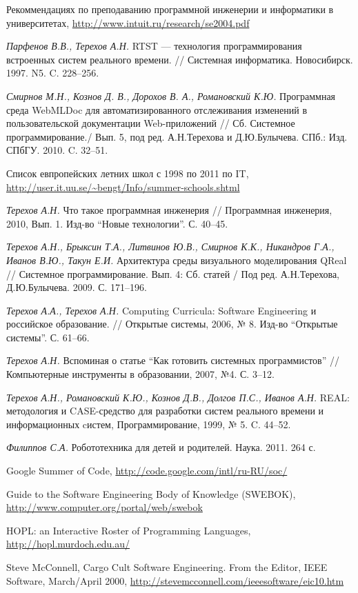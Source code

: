 \documentclass[a4paper]{article}
\begin{document}
\begin{thebibliography}{9001}
   Рекоммендациях по преподаванию программной инженерии и информатики в университетах, \url{http://www.intuit.ru/research/se2004.pdf}  

   \emph{Парфенов В.В., Терехов А.Н.} RTST --- технология программирования встроенных систем реального времени. // Системная информатика. Новосибирск. 1997. N5. C. 228--256.
  
  \emph{Смирнов М.Н., Кознов Д. В., Дорохов В. А., Романовский К.Ю.} Программная среда WebMLDoc для автоматизированного отслеживания изменений в пользовательской документации Web-приложений // Сб. Системное программирование./ Вып. 5, под ред. А.Н.Терехова и Д.Ю.Булычева. СПб.: Изд. СПбГУ. 2010. C. 32--51.
  
   Список  евпропейских летних школ с 1998 по 2011 по IT, \url{http://user.it.uu.se/~bengt/Info/summer-schools.shtml}

  \emph{Терехов А.Н.} Что такое программная инженерия // Программная инженерия, 2010, Вып. 1. Изд-во ``Новые технологии''. С. 40--45.

   \emph{Терехов А.Н., Брыксин Т.А., Литвинов Ю.В., Смирнов К.К., Никандров  Г.А., Иванов В.Ю., Такун Е.И.} Архитектура среды визуального  моделирования QReal // Системное программирование. Вып. 4: Сб. статей  / Под ред. А.Н.Терехова, Д.Ю.Булычева. 2009. С. 171--196.

  \emph{Терехов А.А., Терехов А.Н.} Computing Curricula: Software Engineering и российское образование. // Открытые системы, 2006, № 8. Изд-во ``Открытые системы''. С. 61--66.

  \emph{Терехов А.Н.} Вспоминая о статье ``Как готовить системных программистов'' // Компьютерные инструменты в образовании, 2007, №4. С. 3--12.

   \emph{Терехов А.Н., Романовский К.Ю., Кознов Д.В., Долгов П.С., Иванов А.Н.} REAL: методология и CASE-средство для разработки систем реального времени и информационных cистем, Программирование, 1999, № 5. C. 44--52.

   \emph{Филиппов С.А.} Робототехника для детей и родителей. Наука. 2011. 264 с.

   Google Summer of Code, \url{http://code.google.com/intl/ru-RU/soc/}

   Guide to the Software Engineering Body of Knowledge (SWEBOK), \url{http://www.computer.org/portal/web/swebok}
  
   HOPL: an Interactive Roster of Programming Languages,  \url{http://hopl.murdoch.edu.au/}
  
   Steve McConnell, Cargo Cult Software Engineering. From the Editor, IEEE Software, March/April 2000, \url{http://stevemcconnell.com/ieeesoftware/eic10.htm}


\end{thebibliography}
\end{document}
